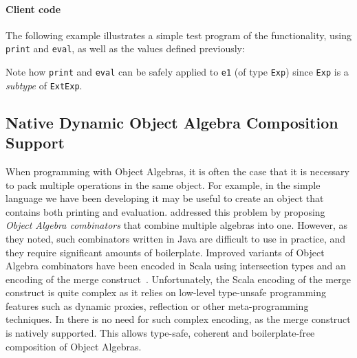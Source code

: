 \paragraph{Client code}
The following example illustrates a simple test program of the
functionality, using \lstinline{print} and \lstinline{eval}, as well
as the values defined previously:

\noindent Note how \lstinline{print} and \lstinline{eval} can be
safely applied to \lstinline{e1} (of type \lstinline{Exp}) since
\lstinline{Exp} is a \emph{subtype} of \lstinline{ExtExp}.

\subsection{Native Dynamic Object Algebra Composition Support}
\label{sec:dynamic}

When programming with Object Algebras, it is often the case that it is
necessary to pack multiple operations in the same object. For example,
in the simple language we have been developing it may be useful to
create an object that contains both printing and evaluation.
\citet{oliveira2012extensibility} addressed this problem by proposing
\textit{Object Algebra combinators} that combine multiple algebras into one.
However, as they noted, such combinators written in Java are difficult to use in
practice, and they require significant amounts of boilerplate. Improved variants
of Object Algebra combinators have been encoded in Scala using intersection
types and an encoding of the merge construct~\cite{oliveira2013feature,
  rendel14attributes}. Unfortunately, the Scala encoding of the merge construct
is quite complex as it relies on low-level type-unsafe programming features such
as dynamic proxies, reflection or other meta-programming techniques. In \name
there is no need for such complex encoding, as the merge construct is natively
supported. This allows type-safe, coherent and boilerplate-free composition of
Object Algebras.

